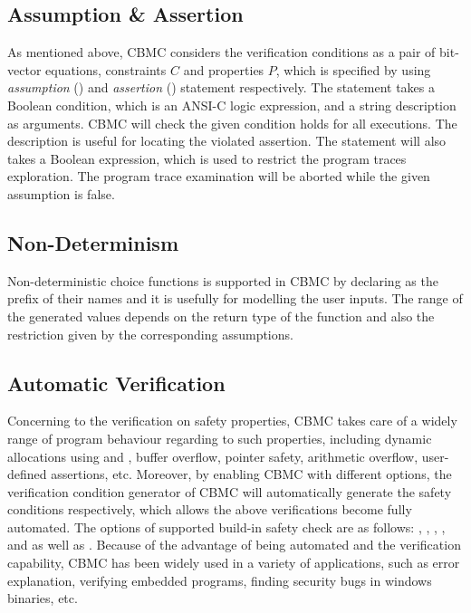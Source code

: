 \subsection{Assumption \& Assertion}
As mentioned above, CBMC considers the verification conditions as a pair of bit-vector equations, constraints $C$ and properties $P$, which is specified by using \textit{assumption} () and \textit{assertion} () statement respectively. The  statement takes a Boolean condition, which is an ANSI-C logic expression, and a string description as arguments. CBMC will check the given condition holds for all executions. The description is useful for locating the violated assertion. The  statement will also takes a Boolean expression, which is used to restrict the program traces exploration. The program trace examination will be aborted while the given assumption is false.

\subsection{Non-Determinism}
Non-deterministic choice functions is supported in CBMC by declaring  as the prefix of their names and it is usefully for modelling the user inputs. The range of the generated values depends on the return type of the function and also the restriction given by the corresponding assumptions. 

\subsection{Automatic Verification} 
Concerning to the verification on safety properties, CBMC takes care of a widely range of program behaviour regarding to such properties, including dynamic allocations using  and , buffer overflow, pointer safety, arithmetic overflow, user-defined assertions, etc. Moreover, by enabling CBMC with different options, the verification condition generator of CBMC will automatically generate the safety conditions respectively, which allows the above verifications become fully automated. The options of supported build-in safety check are as follows: , , ,  , and  as well as . Because of the advantage of being automated and the verification capability, CBMC has been widely used in a variety of applications, such as error explanation, verifying embedded programs, finding security bugs in windows binaries, etc.

